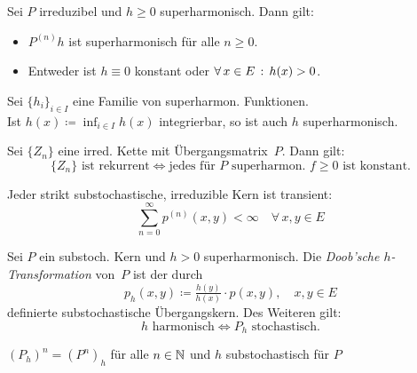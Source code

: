 \documentclass{cheat-sheet}
\begin{document}
\begin{lem}
  Sei $P$ irreduzibel und $h \geq 0$ superharmonisch.
  Dann gilt:
  \begin{itemize}
    \item $P^{(n)} h$ ist superharmonisch für alle $n \geq 0$.
    \item Entweder ist $h \equiv 0$ konstant oder $\forall \, {x \in E} \,:\, h(x) > 0$.
  \end{itemize}
\end{lem}

\begin{lem}
  Sei $\{ h_i \}_{i \in I}$ eine Familie von superharmon. Funktionen. \\
  Ist $h(x) \coloneqq {\inf}_{i \in I} h(x)$ integrierbar, so ist auch $h$ superharmonisch.
\end{lem}

\begin{satz}
  Sei $\{ Z_n \}$ eine irred. Kette mit Übergangsmatrix~$P$.
  Dann gilt:
  \[
    \{ Z_n \} \text{ ist rekurrent} \iff
    \text{jedes für~$P$ superharmon. $f \geq 0$ ist konstant}.
  \]
\end{satz}

\begin{bem}
  Jeder strikt substochastische, irreduzible Kern ist transient:
  \[
    {\sum}_{n=0}^\infty p^{(n)}(x, y) < \infty \quad
    \forall \, x, y \in E
  \]
\end{bem}

\begin{lemdefn}
  Sei $P$ ein substoch. Kern und $h > 0$ superharmonisch.
  Die \emph{Doob'sche $h$-Transformation} von~$P$ ist der durch
  \[
    p_h(x, y) \coloneqq \tfrac{h(y)}{h(x)} \cdot p(x, y), \quad
    x, y \in E
  \]
  definierte substochastische Übergangskern.
  Des Weiteren gilt:
  \[
    h \text{ harmonisch} \iff P_h \text{ stochastisch}.
  \]
\end{lemdefn}

\begin{lem}
  $(P_h)^n = (P^n)_h$ für alle $n \in \mathbb{N}$ und $h$ substochastisch für $P$
\end{lem}
\end{document}
